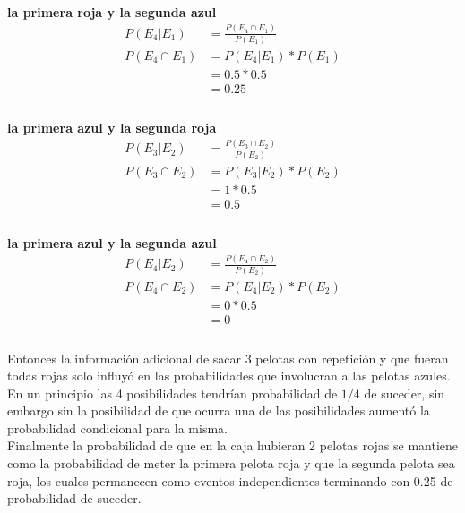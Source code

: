 \documentclass[12pt]{article}
\begin{document}
	 \paragraph{}\textbf{la primera roja y la segunda azul}\\
	 \begin{equation}\label{e41in}
	 \begin{split}
	 P(E_4|E_1) &= \frac{P(E_4 \cap E_1)}{P(E_1)}\\
	 P(E_4 \cap E_1) &= P(E_4|E_1) * P(E_1)\\
	 &= 0.5 * 0.5\\
	 &= 0.25\\
	 \end{split}
	 \end{equation}
	 
	 \paragraph{}\textbf{la primera azul y la segunda roja}\\
	 \begin{equation}\label{e32in}
	 \begin{split}
	 P(E_3|E_2) &= \frac{P(E_3 \cap E_2)}{P(E_2)}\\
	 P(E_3 \cap E_2) &= P(E_3|E_2) * P(E_2)\\
	 &= 1 * 0.5\\
	 &= 0.5\\
	 \end{split}
	 \end{equation}
	 \paragraph{}\textbf{la primera azul y la segunda azul}\\
	 \begin{equation}\label{e42in}
	 \begin{split}
	 P(E_4|E_2) &= \frac{P(E_4 \cap E_2)}{P(E_2)}\\
	 P(E_4 \cap E_2) &= P(E_4|E_2) * P(E_2)\\
	 &= 0 * 0.5\\
	 &= 0\\
	 \end{split}
	 \end{equation}\\
	 Entonces la información adicional de sacar 3 pelotas con repetición y que fueran todas rojas solo influyó en las probabilidades que involucran a las pelotas azules. En un principio las 4 posibilidades tendrían probabilidad de $1/4$ de suceder, sin embargo sin la posibilidad de que ocurra una de las posibilidades aumentó la probabilidad condicional para la misma.\\
	 Finalmente la probabilidad de que en la caja hubieran 2 pelotas rojas se mantiene como la probabilidad de meter la primera pelota roja y que la segunda pelota sea roja, los cuales permanecen como eventos independientes terminando con 0.25 de probabilidad de suceder.
\end{document}
